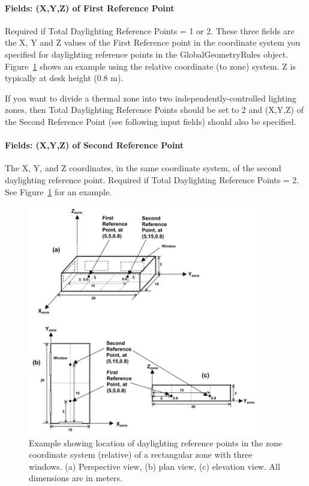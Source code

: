 \paragraph{Fields: (X,Y,Z) of First Reference Point}\label{fields-xyz-of-first-reference-point}

Required if Total Daylighting Reference Points = 1 or 2. These three fields are the X, Y and Z values of the First Reference point in the coordinate system you specified for daylighting reference points in the GlobalGeometryRules object. Figure~\ref{fig:example-showing-location-of-daylighting} shows an example using the relative coordinate (to zone) system. Z is typically at desk height (0.8 m).

If you want to divide a thermal zone into two independently-controlled lighting zones, then Total Daylighting Reference Points should be set to 2 and (X,Y,Z) of the Second Reference Point (see following input fields) should also be specified.

\paragraph{Fields: (X,Y,Z) of Second Reference Point}\label{fields-xyz-of-second-reference-point}

The X, Y, and Z coordinates, in the same coordinate system, of the second daylighting reference point. Required if Total Daylighting Reference Points = 2. See Figure~\ref{fig:example-showing-location-of-daylighting} for an example.

\begin{figure}[hbtp] %
\centering
\includegraphics[width=0.9\textwidth, height=0.9\textheight, keepaspectratio=true]{media/image095.png}
\caption{Example showing location of daylighting reference points in the zone coordinate system (relative) of a rectangular zone with three windows. (a) Perspective view, (b) plan view, (c) elevation view. All dimensions are in meters. \protect \label{fig:example-showing-location-of-daylighting}}
\end{figure}

